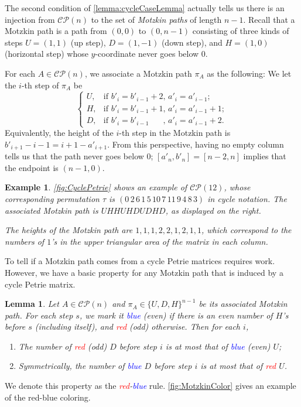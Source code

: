\documentclass[pdflatex,sn-mathphys-num]{sn-jnl}%
\theoremstyle{thmstyleone}%
\newtheorem{lemma}[theorem]{Lemma}
\theoremstyle{thmstyletwo}%
\newtheorem{example}[theorem]{Example}
\theoremstyle{thmstylethree}%
\numberwithin{equation}{section}
\begin{document}
        The second condition of \cref{lemma:cycleCaseLemma} actually tells us there is an injection from $\mathcal{CP}(n)$ to the set of \textit{Motzkin paths} of length $n-1$. Recall that a Motzkin path is a path from $(0,0)$ to $(0,n-1)$ consisting of three kinds of steps $U=(1,1)$ (up step), $D=(1,-1)$ (down step), and $H=(1,0)$ (horizontal step) whose $y$-coordinate never goes below $0$. 
        
        For each $A\in \mathcal{CP}(n)$, we associate a Motzkin path $\pi_A$ as the following: We let the $i$-th step of $\pi_A$ be
        \[\begin{cases}
            U, & \text{if } b'_i=b'_{i-1}+2,\, a'_i=a'_{i-1}; \\
            H, & \text{if } b'_i=b'_{i-1}+1,\, a'_i=a'_{i-1}+1; \\
            D, & \text{if } b'_i=b'_{i-1}\phantom{{}+1},\, a'_i=a'_{i-1}+2. 
        \end{cases}\]
        Equivalently, the height of the $i$-th step in the Motzkin path is $b'_{i+1}-i-1 = i+1-a'_{i+1}$. From this perspective, having no empty column tells us that the path never goes below $0$; $[a'_n,b'_n]=[n-2,n]$ implies that the endpoint is $(n-1,0)$.

        \begin{example}
            \cref{fig:CyclePetrie} shows an example of $\mathcal{CP}(12)$, whose corresponding permutation $\tau$ is $(0\,2\,6\,1\,5\,10\,7\,11\,9\,4\,8\,3)$ in cycle notation. The associated Motzkin path is $UHHUHDUDHD$, as displayed on the right.

            The heights of the Motzkin path are $1,1,1,2,2,1,2,1,1$, which correspond to the numbers of $1$'s in the upper triangular area of the matrix in each column.
        \end{example}
        
        To tell if a Motzkin path comes from a cycle Petrie matrices requires work. However, we have a basic property for any Motzkin path that is induced by a cycle Petrie matrix.

        \newcommand{\blue}{\textcolor{blue}{blue}}
        \newcommand{\red}{\textcolor{red}{red}}
        \begin{lemma}\label{lemma:MotzkinChar}
            Let $A\in \mathcal{CP}(n)$ and $\pi_A\in \{U,D,H\}^{n-1}$ be its associated Motzkin path. For each step $s$, we mark it \blue{} (even) if there is an even number of $H$'s before $s$ (including itself), and \red{} (odd) otherwise. Then for each $i$, 
            \begin{enumerate}
                \item The number of \red{} (odd) $D$ before step $i$ is at most that of \blue{} (even) $U$;
                \item Symmetrically, the number of \blue{} $D$ before step $i$ is at most that of \red{} $U$.
            \end{enumerate}
        \end{lemma}
        We denote this property as the \textit{\red-\blue} rule. \cref{fig:MotzkinColor} gives an example of the red-blue coloring.
        
\end{document}
